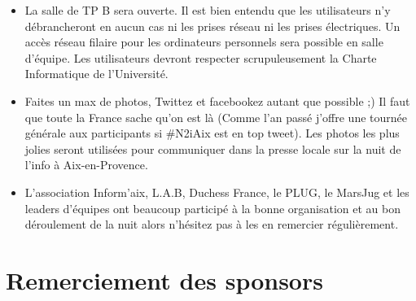 \documentclass[a4paper,11pt]{article}
\begin{document}
\begin{itemize}
	\item La salle de TP B sera ouverte. Il est bien entendu que les utilisateurs n'y débrancheront en aucun cas ni les prises réseau ni les prises électriques. Un accès réseau filaire pour les ordinateurs personnels sera possible en salle d'équipe. Les utilisateurs devront respecter scrupuleusement la Charte Informatique de l'Université.

	\item Faites un max de photos, Twittez et facebookez autant que possible ;) Il faut que toute la France sache qu'on est là (Comme l'an passé j'offre une tournée générale aux participants si \#N2iAix est en top tweet). Les photos les plus jolies seront utilisées pour communiquer dans la presse locale sur la nuit de l'info à Aix-en-Provence.

	\item L'association Inform'aix, L.A.B, Duchess France, le PLUG, le MarsJug et les leaders d'équipes ont beaucoup participé à la bonne organisation et au bon déroulement de la nuit alors n'hésitez pas à les en remercier régulièrement.
\end{itemize}

\section{Remerciement des sponsors}
\end{document}
